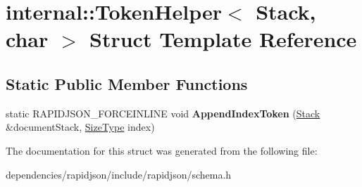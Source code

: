 \hypertarget{structinternal_1_1_token_helper_3_01_stack_00_01char_01_4}{}\section{internal\+:\+:Token\+Helper$<$ Stack, char $>$ Struct Template Reference}
\label{structinternal_1_1_token_helper_3_01_stack_00_01char_01_4}
\subsection*{Static Public Member Functions}
\begin{DoxyCompactItemize}
\item 
\mbox{\label{structinternal_1_1_token_helper_3_01_stack_00_01char_01_4_a5d635eb7590e098c3340c9e5dcc72ae3}} 
static R\+A\+P\+I\+D\+J\+S\+O\+N\+\_\+\+F\+O\+R\+C\+E\+I\+N\+L\+I\+NE void {\bfseries Append\+Index\+Token} (\hyperlink{classinternal_1_1_stack}{Stack} \&document\+Stack, \hyperlink{rapidjson_8h_a5ed6e6e67250fadbd041127e6386dcb5}{Size\+Type} index)
\end{DoxyCompactItemize}


The documentation for this struct was generated from the following file\+:\begin{DoxyCompactItemize}
\item 
dependencies/rapidjson/include/rapidjson/schema.\+h\end{DoxyCompactItemize}
